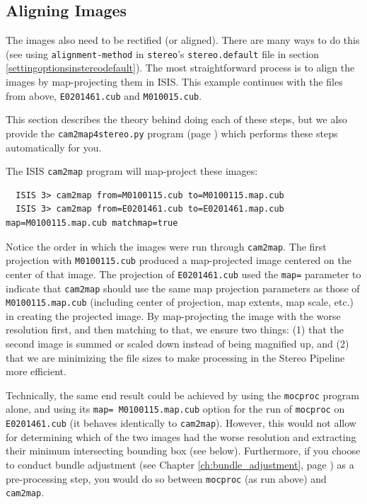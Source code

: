 \subsection{Aligning Images}
\label{sec:AligningImages}

The images also need to be rectified (or aligned).  There are many
ways to do this (see using \texttt{alignment-method} in \texttt{stereo}'s
\texttt{stereo.default} file in section
\ref{settingoptionsinstereodefault}).  The most straightforward
process is to align the images by map-projecting them in \ac{ISIS}.
This example continues with the files from above, \texttt{E0201461.cub}
and \texttt{M010015.cub}.

This section describes the theory behind doing each of these steps,
but we also provide the \texttt{cam2map4stereo.py} program (page
\pageref{cam2map4stereo}) which performs these steps automatically
for you.

The \ac{ISIS} \texttt{cam2map} program will map-project these images:

\begin{verbatim}
  ISIS 3> cam2map from=M0100115.cub to=M0100115.map.cub
  ISIS 3> cam2map from=E0201461.cub to=E0201461.map.cub map=M0100115.map.cub matchmap=true
\end{verbatim}

Notice the order in which the images were run through
\texttt{cam2map}. The first projection with \texttt{M0100115.cub}
produced a map-projected image centered on the center of that image.
The projection of \texttt{E0201461.cub} used the \texttt{map=}
parameter to indicate that \texttt{cam2map} should use the same map
projection parameters as those of \texttt{M0100115.map.cub} (including
center of projection, map extents, map scale, etc.) in creating the
projected image. By map-projecting the image with the worse resolution
first, and then matching to that, we ensure two things: (1) that the
second image is summed or scaled down instead of being magnified up,
and (2) that we are minimizing the file sizes to make processing in
the Stereo Pipeline more efficient.

Technically, the same end result could be achieved by using the
\texttt{mocproc} program alone, and using its \texttt{map=
M0100115.map.cub} option for the run of \texttt{mocproc} on
\texttt{E0201461.cub} (it behaves identically to \texttt{cam2map}).
However, this would not allow for determining which of the two
images had the worse resolution and extracting their minimum
intersecting bounding box (see below).  Furthermore, if you choose
to conduct bundle adjustment (see Chapter \ref{ch:bundle_adjustment},
page \pageref{ch:bundle_adjustment}) as a pre-processing step, you
would do so between \texttt{mocproc} (as run above) and \texttt{cam2map}.

